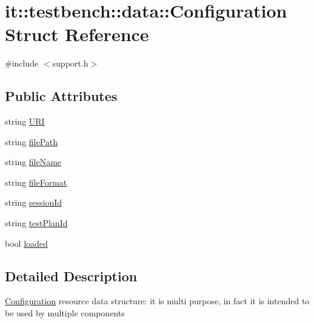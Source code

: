 \hypertarget{structit_1_1testbench_1_1data_1_1Configuration}{\section{it\-:\-:testbench\-:\-:data\-:\-:Configuration Struct Reference}
\label{d1/d49/structit_1_1testbench_1_1data_1_1Configuration}
}


{\ttfamily \#include $<$support.\-h$>$}

\subsection*{Public Attributes}
\begin{DoxyCompactItemize}
\item 
string \hyperlink{structit_1_1testbench_1_1data_1_1Configuration_a398b2a31ac8b59a3ff53038504bd1717}{U\-R\-I}
\item 
string \hyperlink{structit_1_1testbench_1_1data_1_1Configuration_ae62b44b93e9d068adadf3b307933ee97}{file\-Path}
\item 
string \hyperlink{structit_1_1testbench_1_1data_1_1Configuration_ae735a3eb50052a1a6373cf1bd6fbcba0}{file\-Name}
\item 
string \hyperlink{structit_1_1testbench_1_1data_1_1Configuration_ac330dcc08b99860e1eee0cf0b4b56f6e}{file\-Format}
\item 
string \hyperlink{structit_1_1testbench_1_1data_1_1Configuration_acfae4c3c17704d6b7dd811e9cfae1936}{session\-Id}
\item 
string \hyperlink{structit_1_1testbench_1_1data_1_1Configuration_a68d050a0e0201f20175b6ba1433c0d11}{test\-Plan\-Id}
\item 
bool \hyperlink{structit_1_1testbench_1_1data_1_1Configuration_a515b1b8394fa1e8e1b7cd3aa721a873e}{loaded}
\end{DoxyCompactItemize}


\subsection{Detailed Description}
\hyperlink{structit_1_1testbench_1_1data_1_1Configuration}{Configuration} resource data structure\-: it is multi purpose, in fact it is intended to be used by multiple components 

